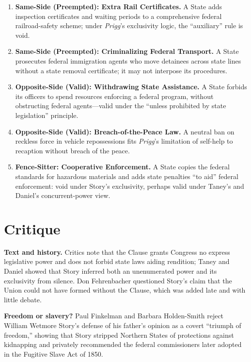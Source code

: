 \documentclass[12pt]{article}
\begin{document}
\begin{enumerate}
\item \textbf{Same-Side (Preempted): Extra Rail Certificates.} A State adds inspection certificates and waiting periods to a comprehensive federal railroad-safety scheme; under \textit{Prigg}'s exclusivity logic, the ``auxiliary'' rule is void.
\item \textbf{Same-Side (Preempted): Criminalizing Federal Transport.} A State prosecutes federal immigration agents who move detainees across state lines without a state removal certificate; it may not interpose its procedures.
\item \textbf{Opposite-Side (Valid): Withdrawing State Assistance.} A State forbids its officers to spend resources enforcing a federal program, without obstructing federal agents---valid under the ``unless prohibited by state legislation'' principle.
\item \textbf{Opposite-Side (Valid): Breach-of-the-Peace Law.} A neutral ban on reckless force in vehicle repossessions fits \textit{Prigg}'s limitation of self-help to recaption without breach of the peace.
\item \textbf{Fence-Sitter: Cooperative Enforcement.} A State copies the federal standards for hazardous materials and adds state penalties ``to aid'' federal enforcement: void under Story's exclusivity, perhaps valid under Taney's and Daniel's concurrent-power view.
\end{enumerate}

\section{Critique}

\textbf{Text and history.} Critics note that the Clause grants Congress no express legislative power and does not forbid state laws aiding rendition; Taney and Daniel showed that Story inferred both an unenumerated power and its exclusivity from silence. Don Fehrenbacher questioned Story's claim that the Union could not have formed without the Clause, which was added late and with little debate.

\textbf{Freedom or slavery?} Paul Finkelman and Barbara Holden-Smith reject William Wetmore Story's defense of his father's opinion as a covert ``triumph of freedom,'' showing that Story stripped Northern States of protections against kidnapping and privately recommended the federal commissioners later adopted in the Fugitive Slave Act of 1850.
\end{document}
